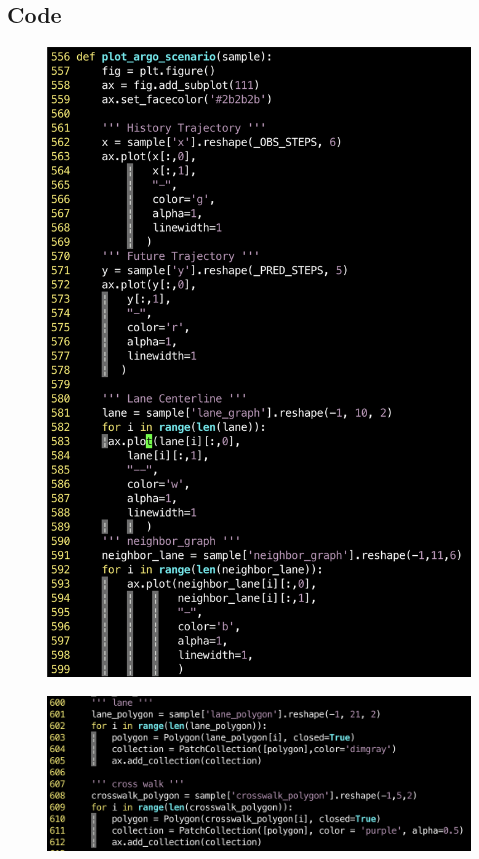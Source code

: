 \documentclass{article}
\begin{document}
\subsection{Code}
\begin{figure}[H]
	\centering
	\includegraphics[scale=0.5]{./part1_1.png}
\end{figure}

\begin{figure}[H]
	\centering
	\includegraphics[scale=0.5]{./part1_2.png}
\end{figure}
\end{document}
